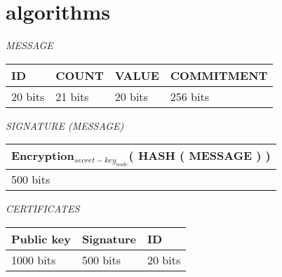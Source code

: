 \chapter{algorithms}

	\textit{MESSAGE}
	\newline
	
	\begin{tabular}{ | l | l | l | l |}
		\hline
		ID & COUNT & VALUE & COMMITMENT \\
		\hline
		20 bits & 21 bits & 20 bits & 256 bits\\
		\hline
	\end{tabular}
	\newline
	\newline
	\textit{SIGNATURE (MESSAGE)}
	\newline

	\begin{tabular}{ |l| }
		\hline
		Encryption$_{secret-key_{node}}$( HASH ( MESSAGE ) )\\
		\hline
		500 bits\\
		\hline
	\end{tabular}
	\newline
	\newline
	\textit{CERTIFICATES}
	\newline

	\begin{tabular}{ | l | l | l | }
		\hline
			Public key  & Signature & ID \\
		\hline
			1000 bits & 500 bits & 20 bits \\
		\hline

	\end{tabular}

